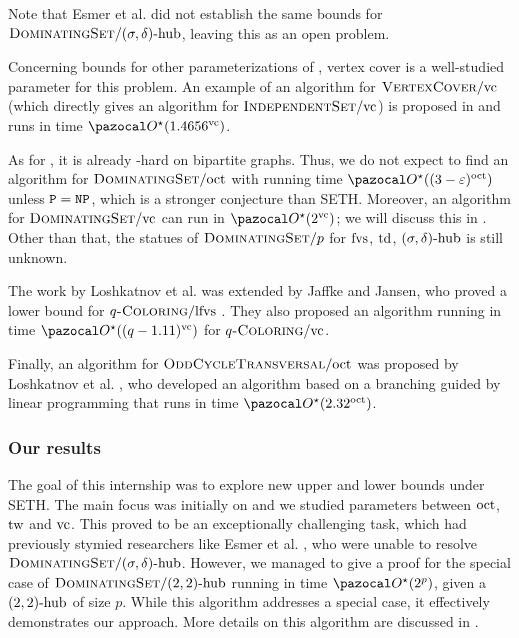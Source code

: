 Note that Esmer et al. did not establish the same bounds for $\prob{DominatingSet}/\sdhub$, leaving this as an open problem.

\medskip

Concerning bounds for other parameterizations of , vertex cover is a well-studied parameter for this problem. An example of an algorithm for $\prob{VertexCover}/\vc$ (which directly gives an algorithm for $\prob{IndependentSet}/\vc$) is proposed in \cite[Theorem 3.2]{cygan2015parameterized} and runs in time $\O^\star(1.4656^\vc)$.

\medskip

As for , it is already \NP-hard on bipartite graphs. Thus, we do not expect to find an algorithm for $\prob{DominatingSet}/\oct$  with running time $\O^\star((3-\varepsilon)^\oct)$ unless $\P = \NP$, which is a stronger conjecture than SETH. Moreover, an algorithm for $\prob{DominatingSet}/\vc$ can run in $\O^\star(2^\vc)$; we will discuss this in . Other than that, the statues of $\prob{DominatingSet}/p$ for $\fvs$, $\td$, $\sdhub$ is still unknown.

\medskip

The work by Loshkatnov et al. \cite{lokshtanov2011known} was extended by Jaffke and Jansen, who proved a lower bound for $q\prob{-Coloring}/\lfvs$ \cite{jaffke2017fine}. They also proposed an algorithm running in time $\O^\star((q - 1.11)^\vc)$ for $q\prob{-Coloring}/\vc$.

\medskip

Finally, an algorithm for $\prob{OddCycleTransversal}/\oct$ was proposed by Loshkatnov et al. \cite{lokshtanov2012subexponential}, who developed an algorithm based on a branching guided by linear programming that runs in time $\O^\star(2.32^\oct)$. 

\subsubsection*{Our results}

The goal of this internship was to explore new upper and lower bounds under SETH. The main focus was initially on  and we studied parameters between $\oct$, $\tw$ and $\vc$. This proved to be an exceptionally challenging task, which had previously stymied researchers like Esmer et al. \cite{esmer2024fundamental}, who were unable to resolve $\prob{DominatingSet}/\sdhub$. However, we managed to give a proof for the special case of $\prob{DominatingSet}/\sdhub[2, 2]$ running in time $\O^\star(2^p)$, given a $\sdhub[2,2]$ of size $p$. While this algorithm addresses a special case, it effectively demonstrates our approach.  More details on this algorithm are discussed in .

